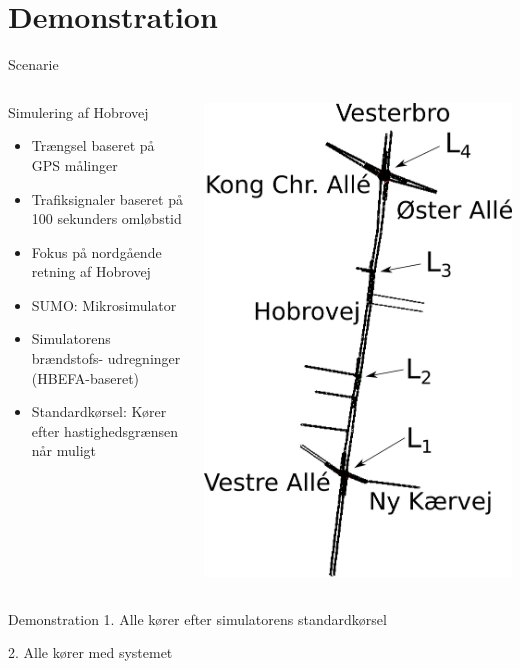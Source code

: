 \section{Demonstration}
\begin{frame}{Scenarie}
\begin{columns}
\begin{column}{0.6\textwidth}
Simulering af Hobrovej
\begin{itemize}
\item Trængsel baseret på GPS målinger
\item Trafiksignaler baseret på 100 sekunders omløbstid
\item Fokus på nordgående retning af Hobrovej
\item SUMO: Mikrosimulator
\item Simulatorens brændstofs- udregninger (HBEFA-baseret)
\item Standardkørsel: Kører efter hastighedsgrænsen når muligt
\end{itemize}
\end{column}

\begin{column}{0.4\textwidth}
\includegraphics[width=1\textwidth]{images/Hobrovej.png}
\end{column}
\end{columns}
\end{frame}

\begin{frame}{Demonstration}
1. Alle kører efter simulatorens standardkørsel
\vspace{4mm}

2. Alle kører med systemet
\end{frame}